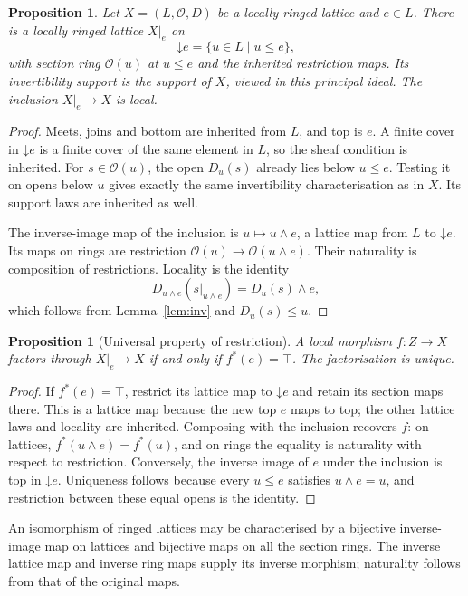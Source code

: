 \documentclass[11pt]{amsart}
\newtheorem{proposition}[theorem]{Proposition}
\theoremstyle{definition}
\theoremstyle{remark}
\newcommand{\OO}{\mathcal O}
\newcommand{\restr}[2]{#1|_{#2}}
\begin{document}
\begin{proposition}\label{prop:restriction}
Let $X=(L,\OO,D)$ be a locally ringed lattice and $e\in L$. There is a
locally ringed lattice $X|_e$ on
\[
 \mathord\downarrow e=\{u\in L\mid u\leq e\},
\]
with section ring $\OO(u)$ at $u\leq e$ and the inherited restriction
maps. Its invertibility support is the support of $X$, viewed in this
principal ideal. The inclusion $X|_e\to X$ is local.
\end{proposition}
\begin{proof}
Meets, joins and bottom are inherited from $L$, and top is $e$.
A finite cover in $\mathord\downarrow e$ is a finite cover of the same
element in $L$, so the sheaf condition is inherited. For $s\in\OO(u)$,
the open $D_u(s)$ already lies below $u\leq e$. Testing it on opens
below $u$ gives exactly the same invertibility characterisation as in
$X$. Its support laws are inherited as well.

The inverse-image map of the inclusion is
$u\mapsto u\wedge e$, a lattice map from $L$ to
$\mathord\downarrow e$. Its maps on rings are restriction
$\OO(u)\to\OO(u\wedge e)$. Their naturality is composition of
restrictions. Locality is the identity
\[
 D_{u\wedge e}(\restr{s}{u\wedge e})=D_u(s)\wedge e,
\]
which follows from Lemma~\ref{lem:inv} and $D_u(s)\leq u$.
\end{proof}

\begin{proposition}[Universal property of restriction]\label{prop:slice-up}
A local morphism $f:Z\to X$ factors through $X|_e\to X$ if and only if
$f^*(e)=\top$. The factorisation is unique.
\end{proposition}
\begin{proof}
If $f^*(e)=\top$, restrict its lattice map to
$\mathord\downarrow e$ and retain its section maps there. This is a
lattice map because the new top $e$ maps to top; the other lattice laws
and locality are inherited. Composing with the inclusion recovers $f$:
on lattices, $f^*(u\wedge e)=f^*(u)$, and on rings the equality is
naturality with respect to restriction. Conversely, the inverse image
of $e$ under the inclusion is top in $\mathord\downarrow e$.
Uniqueness follows because every $u\leq e$ satisfies $u\wedge e=u$,
and restriction between these equal opens is the identity.
\end{proof}

An isomorphism of ringed lattices may be characterised by a bijective
inverse-image map on lattices and bijective maps on all the section
rings. The inverse lattice map and inverse ring maps supply its inverse
morphism; naturality follows from that of the original maps.
\end{document}
